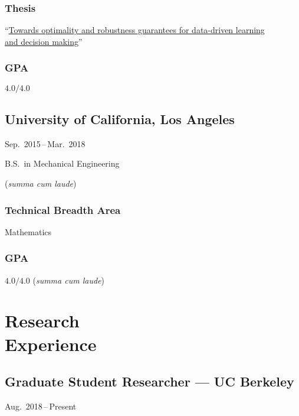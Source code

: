 \documentclass[11pt]{article}
\newcommand{\sectionwidth}{1in}		%
\newcommand{\subsectionskip}{\baselineskip}	%
\newcommand{\cvdates}[2]{\hfill#1\,--\,#2}	%
\begin{document}
	\subsubsection{Thesis}
	``\href{https://brendon-anderson.github.io/files/publications/ms_thesis.pdf}{Towards optimality and robustness guarantees for data-driven learning \\
	\hspace*{\sectionwidth}and decision making}''
	
	\begin{gpa-on}
		\subsubsection{GPA}
		$4.0/4.0$
	\end{gpa-on}
	
	\vspace*{\subsectionskip}
	
	\subsection{University of California, Los Angeles}
	\cvdates{Sep.\ 2015}{Mar.\ 2018}
	
	\hspace*{\sectionwidth}B.S.\ in Mechanical Engineering
	\begin{gpa-off}
		(\textit{summa cum laude})
	\end{gpa-off}
	
	\subsubsection{Technical Breadth Area}
	Mathematics
	
	\begin{gpa-on}
		\subsubsection{GPA}
		$4.0/4.0$ (\textit{summa cum laude})
	\end{gpa-on}
	
	\section{\texorpdfstring{Research \\[\baselineskip] Experience}{Research Experience}}
	\hfill\vspace*{-2\baselineskip}

	\subsection{Graduate Student Researcher --- UC Berkeley}
	\cvdates{Aug.\ 2018}{Present}
	
\end{document}
